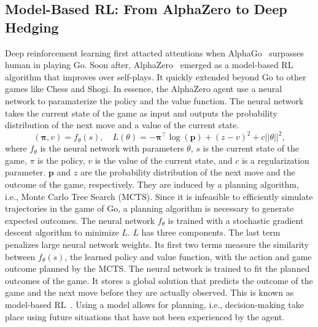 \subsection{Model-Based RL: From AlphaZero to Deep Hedging}
Deep reinforcement learning first attacted attentions when AlphaGo~\citep{silver2016mastering} surpasses human in playing Go. 
Soon after, AlphaZero~\citep{silver2016mastering} emerged as a model-based RL algorithm that improves over self-plays.
It quickly extended beyond Go to other games like Chess and Shogi.
In essence, the AlphaZero agent use a neural network to paramaterize the policy and the value function.
The neural network takes the current state of the game as input and outputs the probability distribution of the next move and a value of the current state.
\begin{equation}
    (\mathbf{\pi}, v) = f_{\theta}(s), \quad L(\theta) = - \mathbf{\pi}^{\intercal} \log(\mathbf{p}) + (z - v)^2  + c||\theta||^2,
\end{equation}
where $f_{\theta}$ is the neural network with parameters $\theta$, $s$ is the current state of the game, $\pi$ is the policy, $v$ is the value of the current state, and $c$ is a regularization parameter.
$\mathbf{p}$ and $z$ are the probability distribution of the next move and the outcome of the game, respectively.
They are induced by a planning algorithm, i.e., Monte Carlo Tree Search (MCTS).
Since it is infeasible to efficiently simulate trajectories in the game of Go, a planning algorithm is necessary to generate expected outcomes.
The neural network $f_{\theta}$ is trained with a stochastic gradient descent algorithm to minimize $L$.
$L$ has three components.
The last term penalizes large neural network weights.
Its first two terms measure the similarity between $f_{\theta}(s)$, the learned policy and value function, with the action and game outcome planned by the MCTS.
The neural network is trained to fit the planned outcomes of the game.
It stores a global solution that predicts the outcome of the game and the next move before they are actually observed.
This is known as model-based RL~\citep{sutton2018reinforcement}.
Using a model allows for planning, i.e., decision-making take place using future situations that have not been experienced by the agent.

